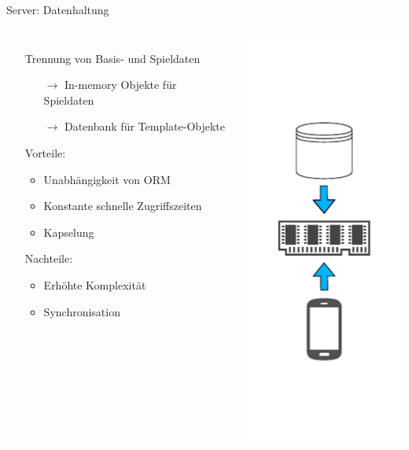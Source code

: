 \begin{frame}{Server: Datenhaltung}
	\begin{columns}
			\begin{itemize}
				\itemsep 12pt
				\item[] Trennung von Basis- und Spieldaten
				\begin{itemize}
					\itemsep 2pt
					\item[$\rightarrow$] In-memory Objekte für Spieldaten
					\item[$\rightarrow$] Datenbank für Template-Objekte   
				\end{itemize}
				\item[] Vorteile:
				\begin{itemize}
					\itemsep 2pt
					\item Unabhängigkeit von ORM
					\item Konstante schnelle Zugriffszeiten
					\item Kapselung
				\end{itemize}
				\item[] Nachteile:
				\begin{itemize}
					\itemsep 2pt
					\item Erhöhte Komplexität
					\item Synchronisation
				\end{itemize}
			\end{itemize}
			\includegraphics[height=\textheight]{images/server/datenhaltung.pdf}
	\end{columns} 
\end{frame}


